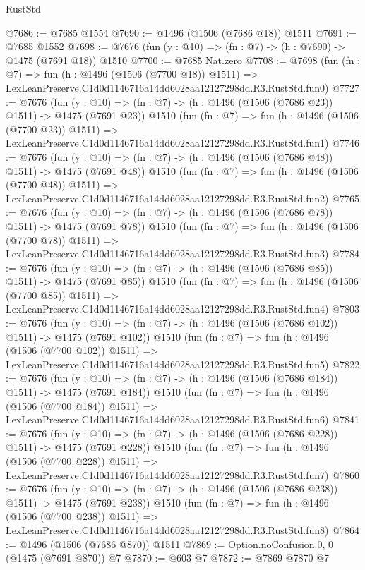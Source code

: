 \begin{lexlean}{RustStd}
\begin{coremodule}
@7686 := @7685 @1554
@7690 := @1496 (@1506 (@7686 @18)) @1511
@7691 := @7685 @1552
@7698 := @7676 (fun (y : @10) => (fn : @7) -> (h : @7690) -> @1475 (@7691 @18)) @1510
@7700 := @7685 Nat.zero
@7708 := @7698
    (fun (fn : @7) =>
    fun (h : @1496 (@1506 (@7700 @18)) @1511) =>
    LexLeanPreserve.C1d0d1146716a14dd6028aa12127298dd.R3.RustStd.fun0)
@7727 := @7676
    (fun (y : @10) => (fn : @7) -> (h : @1496 (@1506 (@7686 @23)) @1511) -> @1475 (@7691 @23))
    @1510
    (fun (fn : @7) =>
    fun (h : @1496 (@1506 (@7700 @23)) @1511) =>
    LexLeanPreserve.C1d0d1146716a14dd6028aa12127298dd.R3.RustStd.fun1)
@7746 := @7676
    (fun (y : @10) => (fn : @7) -> (h : @1496 (@1506 (@7686 @48)) @1511) -> @1475 (@7691 @48))
    @1510
    (fun (fn : @7) =>
    fun (h : @1496 (@1506 (@7700 @48)) @1511) =>
    LexLeanPreserve.C1d0d1146716a14dd6028aa12127298dd.R3.RustStd.fun2)
@7765 := @7676
    (fun (y : @10) => (fn : @7) -> (h : @1496 (@1506 (@7686 @78)) @1511) -> @1475 (@7691 @78))
    @1510
    (fun (fn : @7) =>
    fun (h : @1496 (@1506 (@7700 @78)) @1511) =>
    LexLeanPreserve.C1d0d1146716a14dd6028aa12127298dd.R3.RustStd.fun3)
@7784 := @7676
    (fun (y : @10) => (fn : @7) -> (h : @1496 (@1506 (@7686 @85)) @1511) -> @1475 (@7691 @85))
    @1510
    (fun (fn : @7) =>
    fun (h : @1496 (@1506 (@7700 @85)) @1511) =>
    LexLeanPreserve.C1d0d1146716a14dd6028aa12127298dd.R3.RustStd.fun4)
@7803 := @7676
    (fun (y : @10) => (fn : @7) -> (h : @1496 (@1506 (@7686 @102)) @1511) -> @1475 (@7691 @102))
    @1510
    (fun (fn : @7) =>
    fun (h : @1496 (@1506 (@7700 @102)) @1511) =>
    LexLeanPreserve.C1d0d1146716a14dd6028aa12127298dd.R3.RustStd.fun5)
@7822 := @7676
    (fun (y : @10) => (fn : @7) -> (h : @1496 (@1506 (@7686 @184)) @1511) -> @1475 (@7691 @184))
    @1510
    (fun (fn : @7) =>
    fun (h : @1496 (@1506 (@7700 @184)) @1511) =>
    LexLeanPreserve.C1d0d1146716a14dd6028aa12127298dd.R3.RustStd.fun6)
@7841 := @7676
    (fun (y : @10) => (fn : @7) -> (h : @1496 (@1506 (@7686 @228)) @1511) -> @1475 (@7691 @228))
    @1510
    (fun (fn : @7) =>
    fun (h : @1496 (@1506 (@7700 @228)) @1511) =>
    LexLeanPreserve.C1d0d1146716a14dd6028aa12127298dd.R3.RustStd.fun7)
@7860 := @7676
    (fun (y : @10) => (fn : @7) -> (h : @1496 (@1506 (@7686 @238)) @1511) -> @1475 (@7691 @238))
    @1510
    (fun (fn : @7) =>
    fun (h : @1496 (@1506 (@7700 @238)) @1511) =>
    LexLeanPreserve.C1d0d1146716a14dd6028aa12127298dd.R3.RustStd.fun8)
@7864 := @1496 (@1506 (@7686 @870)) @1511
@7869 := Option.noConfusion.{0, 0} (@1475 (@7691 @870)) @7
@7870 := @603 @7
@7872 := @7869 @7870 @7

\end{coremodule}
\end{lexlean}
